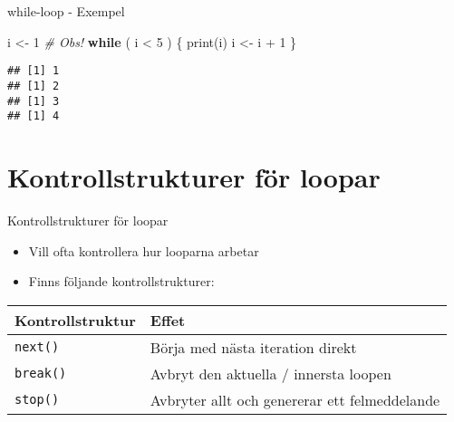 \documentclass[
  11pt,
  ignorenonframetext,
]{beamer}
\newenvironment{Shaded}{\begin{snugshade}}{\end{snugshade}}
\newcommand{\CommentTok}[1]{\textcolor[rgb]{0.56,0.35,0.01}{\textit{#1}}}
\newcommand{\ControlFlowTok}[1]{\textcolor[rgb]{0.13,0.29,0.53}{\textbf{#1}}}
\newcommand{\DecValTok}[1]{\textcolor[rgb]{0.00,0.00,0.81}{#1}}
\newcommand{\FunctionTok}[1]{\textcolor[rgb]{0.00,0.00,0.00}{#1}}
\newcommand{\NormalTok}[1]{#1}
\newcommand{\OtherTok}[1]{\textcolor[rgb]{0.56,0.35,0.01}{#1}}
\newcommand{\SpecialCharTok}[1]{\textcolor[rgb]{0.00,0.00,0.00}{#1}}
\providecommand{\tightlist}{%
  \setlength{\itemsep}{0pt}\setlength{\parskip}{0pt}}
\begin{document}

\begin{frame}[fragile]{while-loop - Exempel}
\protect\hypertarget{while-loop---exempel}{}
\begin{Shaded}
\begin{Highlighting}[]
\NormalTok{i }\OtherTok{\textless{}{-}} \DecValTok{1} \CommentTok{\# Obs!}
\ControlFlowTok{while}\NormalTok{ ( i }\SpecialCharTok{\textless{}} \DecValTok{5}\NormalTok{ ) \{}
  \FunctionTok{print}\NormalTok{(i)}
\NormalTok{  i }\OtherTok{\textless{}{-}}\NormalTok{ i }\SpecialCharTok{+} \DecValTok{1}
\NormalTok{\}}
\end{Highlighting}
\end{Shaded}

\pause

\begin{verbatim}
## [1] 1
## [1] 2
## [1] 3
## [1] 4
\end{verbatim}
\end{frame}

\hypertarget{kontrollstrukturer-fuxf6r-loopar}{%
\section{Kontrollstrukturer för
loopar}\label{kontrollstrukturer-fuxf6r-loopar}}


\begin{frame}{Kontrollstrukturer för loopar}
\protect\hypertarget{kontrollstrukturer-fuxf6r-loopar-1}{}
\begin{itemize}
\tightlist
\item
  Vill ofta kontrollera hur looparna arbetar
\item
  Finns följande kontrollstrukturer:
\end{itemize}

\begin{longtable}[]{@{}ll@{}}
\toprule
\textbf{Kontrollstruktur} & \textbf{Effet} \\
\midrule
\endhead
\texttt{next()} & Börja med nästa iteration direkt \\
\texttt{break()} & Avbryt den aktuella / innersta loopen \\
\texttt{stop()} & Avbryter allt och genererar ett felmeddelande \\
\bottomrule
\end{longtable}
\end{frame}

\end{document}
